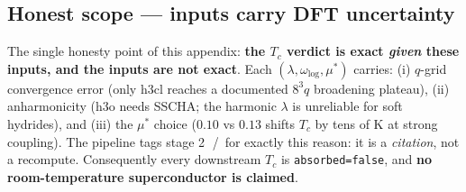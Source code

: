 \subsection{Honest scope --- inputs carry DFT uncertainty}
\label{app:elph-honest}

The single honesty point of this appendix: \textbf{the $T_c$ verdict is
exact \emph{given} these inputs, and the inputs are not exact}. Each
$(\lambda, \omega_{\log}, \mu^{*})$ carries: (i) $q$-grid convergence error
(only h3cl reaches a documented $8^3q$ broadening plateau), (ii)
anharmonicity (h3o needs SSCHA; the harmonic $\lambda$ is unreliable for
soft hydrides), and (iii) the $\mu^{*}$ choice ($0.10$ vs $0.13$ shifts
$T_c$ by tens of K at strong coupling). The pipeline tags stage
\textcircled{\scriptsize 2} \tierYellow/\tierOrange\ for exactly this
reason: it is a \emph{citation}, not a recompute. Consequently every
downstream $T_c$ is \texttt{absorbed=false}, and \textbf{no
room-temperature superconductor is claimed}.
